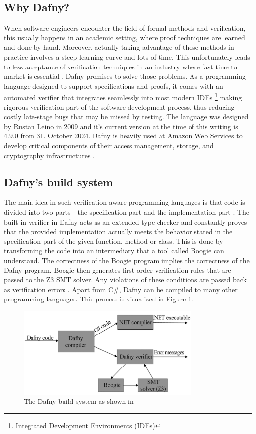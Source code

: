 \documentclass[a4paper]{article}
\begin{document}
\subsection{Why Dafny?}
When software engineers encounter the field of formal methods and verification, this usually happens
in an academic setting, where proof techniques are learned and done by hand. Moreover, actually taking advantage
of those methods in practice involves a steep learning curve and lots of time. This unfortunately leads to less
acceptance of verification techniques in
an industry where fast time to market is essential \cite{reid2020makingformalmethodsnormal}. Dafny promises to solve those problems. As a programming
language designed to support specifications and proofs, it comes with an automated verifier that integrates
seamlessly into most modern IDEs \footnote{Integrated Development Environments (IDEs)} making rigorous verification part of the software development process,
thus reducing costly late-stage bugs that may be missed by testing. The language was designed by Rustan Leino in
2009 and it's current version at the time of this writing is 4.9.0 from 31. October 2024. Dafny is heavily
used at Amazon Web Services to develop critical components of their access management, storage, and cryptography infrastructures \cite{Chakarov2022}.

\subsection{Dafny's build system}
The main idea in such verification-aware programming languages is that code is divided into two parts - the
specification part and the implementation part \cite{leino2023program}. The built-in verifier in Dafny acts as an
extended type checker and constantly proves that the provided implementation actually meets the behavior stated in
the specification part of the given function, method or class. This is done by transforming the code into an intermediary
that a tool called Boogie can understand. The correctness of the Boogie program implies the correctness of the
Dafny program. Boogie then generates first-order verification rules that are passed to the
Z3 SMT solver. Any violations of these conditions are passed back as verification errors \cite{Herbert2012}. Apart
from C\#, Dafny can be compiled to many other programming languages. This process is visualized in
Figure \ref{fig:build-system}.
\begin{figure}[h]
	\centering
	\includegraphics[width=0.80\textwidth]{images/dafny-infra.jpg}
	\caption{The Dafny build system as shown in \cite{Herbert2012}}
	\label{fig:build-system}
\end{figure}
\end{document}
